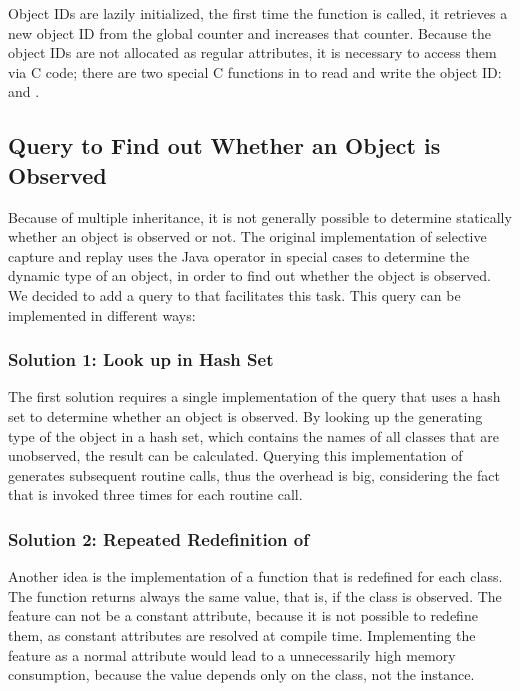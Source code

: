 Object IDs are lazily initialized, the first time the function  is called, it retrieves a new object ID from the global counter  and increases that counter. Because the object IDs are not allocated as regular attributes, it is necessary to access them via C code; there are two special C functions in  to read and write the object ID:  and .


\subsection{Query to Find out Whether an Object is Observed}
\label{lbl:is_observed}
Because of multiple inheritance, it is not generally possible to determine statically whether an object is observed or not. The original implementation of selective capture and replay uses the Java operator  in special cases to determine the dynamic type of an object, in order to find out whether the object is observed. We decided to add a query to  that facilitates this task. This query can be implemented in different ways: 

\subsubsection{Solution 1: Look up in Hash Set}
The first solution requires a single implementation of the query  that uses a hash set to determine whether an object is observed. By looking up the generating type of the object in a hash set, which contains the names of all classes that are unobserved, the result can be calculated. Querying this implementation of  generates subsequent routine calls, thus the overhead is big, considering the fact that  is invoked three times for each routine call.

\subsubsection{Solution 2: Repeated Redefinition of }
Another idea is the implementation of a function that is redefined for each class. The function returns always the same value, that is, if the class is observed. The feature can not be a constant attribute, because it is not possible to redefine them, as constant attributes  are resolved at compile time. Implementing the feature as a normal attribute would lead to a unnecessarily high memory consumption, because the value depends only on the class, not the instance.

